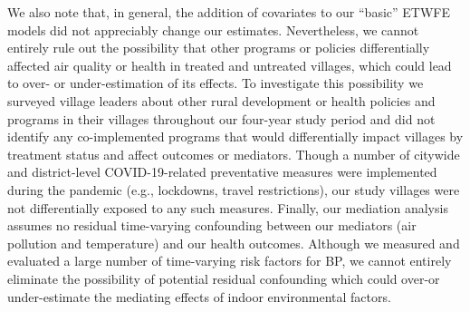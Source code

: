 \documentclass[
  letterpaper,
  DIV=11,
  numbers=noendperiod]{scrartcl}
\begin{document}
We also note that, in general, the addition of covariates to our
``basic'' ETWFE models did not appreciably change our estimates.
Nevertheless, we cannot entirely rule out the possibility that other
programs or policies differentially affected air quality or health in
treated and untreated villages, which could lead to over- or
under-estimation of its effects. To investigate this possibility we
surveyed village leaders about other rural development or health
policies and programs in their villages throughout our four-year study
period and did not identify any co-implemented programs that would
differentially impact villages by treatment status and affect outcomes
or mediators. Though  a number of citywide and
district-level COVID-19-related preventative measures were implemented
during the pandemic (e.g., lockdowns, travel restrictions), our study
villages were not differentially exposed to any such measures. Finally,
our mediation analysis assumes no residual time-varying confounding
between our mediators (air pollution and temperature) and our health
outcomes. Although we measured and evaluated a large number of
time-varying risk factors for BP, we cannot entirely eliminate the
possibility of potential residual confounding which could over-or
under-estimate the mediating effects of indoor environmental factors.
\end{document}
